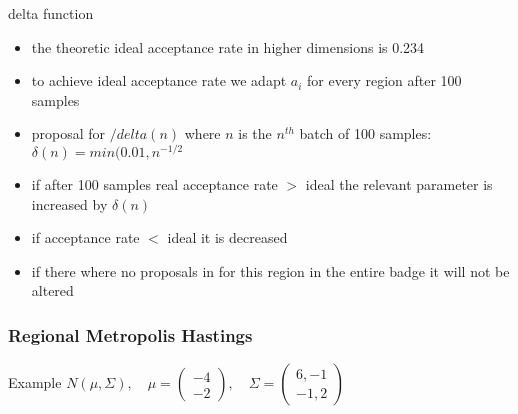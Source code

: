 \begin{frame}
\begin{block}{delta function}
\begin{itemize} 
\item the theoretic ideal acceptance rate in higher dimensions is 0.234
\item to achieve ideal acceptance rate we adapt $a_i$ for every region after 100 samples
\item proposal for $/delta(n)$ where $n$ is the $n^{th}$ batch of 100 samples:\\
$\delta(n) = min(0.01,n^{-1/2}$
\item if after 100 samples real acceptance rate $>$ ideal the relevant parameter is increased by $\delta(n)$
\item if acceptance rate $<$ ideal it is decreased
\item if there where no proposals in for this region in the entire badge it will not be altered 
\end{itemize}
\end{block}
\end{frame}


\begin{frame}
\frametitle{Regional Metropolis Hastings}
\begin{block}{Example}
$N(\mu, \Sigma), \quad \mu = \begin{pmatrix} -4 \\ -2
\end{pmatrix} , \quad \Sigma = \begin{pmatrix} 6,-1 \\ -1,2
\end{pmatrix}$
\end{block}
\end{frame}